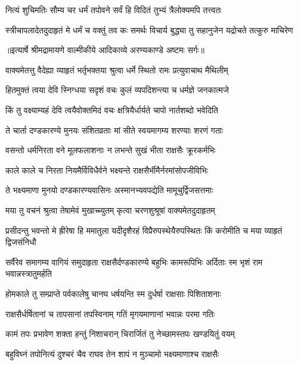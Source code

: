 \twolineshloka
{नित्यं शुचिमतिः सौम्य चर धर्मं तपोवने}
{सर्वं हि विदितं तुभ्यं त्रैलोक्यमपि तत्त्वतः} %

\fourlineindentedshloka
{स्त्रीचापलादेतदुदाहृतं मे}
{धर्मं च वक्तुं तव कः समर्थः}
{विचार्य बुद्ध्या तु सहानुजेन}
{यद्रोचते तत्कुरु माचिरेण} %


{॥इत्यार्षे श्रीमद्रामायणे वाल्मीकीये आदिकाव्ये अरण्यकाण्डे अष्टमः सर्गः॥}


\twolineshloka
{वाक्यमेतत्तु वैदेह्या व्याहृतं भर्तृभक्तया}
{श्रुत्वा धर्मे स्थितो रामः प्रत्युवाचाथ मैथिलीम्} %

\twolineshloka
{हितमुक्तं त्वया देवि स्निग्धया सदृशं वचः}
{कुलं व्यपदिशन्त्या च धर्मज्ञे जनकात्मजे} %

\twolineshloka
{किं तु वक्ष्याम्यहं देवि त्वयैवोक्तमिदं वचः}
{क्षत्रियैर्धार्यते चापो नार्तशब्दो भवेदिति} %

\twolineshloka
{ते चार्ता दण्डकारण्ये मुनयः संशितव्रताः}
{मां सीते स्वयमागम्य शरण्याः शरणं गताः} %

\twolineshloka
{वसन्तो धर्मनिरता वने मूलफलाशनाः}
{न लभन्ते सुखं भीता राक्षसैः क्रूरकर्मभिः} %

\twolineshloka
{काले काले च निरता नियमैर्विविधैर्वने}
{भक्ष्यन्ते राक्षसैर्भीमैर्नरमांसोपजीविभिः} %

\twolineshloka
{ते भक्ष्यमाणा मुनयो दण्डकारण्यवासिनः}
{अस्मानभ्यवपद्येति मामूचुर्द्विजसत्तमाः} %

\twolineshloka
{मया तु वचनं श्रुत्वा तेषामेवं मुखाच्च्युतम्}
{कृत्वा चरणशुश्रूषां वाक्यमेतदुदाहृतम्} %

\threelineshloka
{प्रसीदन्तु भवन्तो मे ह्रीरेषा हि ममातुला}
{यदीदृशैरहं विप्रैरुपस्थेयैरुपस्थितः}
{किं करोमीति च मया व्याहृतं द्विजसंनिधौ} %

\threelineshloka
{सर्वैरेव समागम्य वागियं समुदाहृता}
{राक्षसैर्दण्डकारण्ये बहुभिः कामरूपिभिः}
{अर्दिताः स्म भृशं राम भवान्नस्त्रातुमर्हति} %

\twolineshloka
{होमकाले तु सम्प्राप्ते पर्वकालेषु चानघ}
{धर्षयन्ति स्म दुर्धर्षा राक्षसाः पिशिताशनाः} %

\twolineshloka
{राक्षसैर्धर्षितानां च तापसानां तपस्विनाम्}
{गतिं मृगयमाणानां भवान्नः परमा गतिः} %

\twolineshloka
{कामं तपः प्रभावेण शक्ता हन्तुं निशाचरान्}
{चिरार्जितं तु नेच्छामस्तपः खण्डयितुं वयम्} %

\twolineshloka
{बहुविघ्नं तपोनित्यं दुश्चरं चैव राघव}
{तेन शापं न मुञ्चामो भक्ष्यमाणाश्च राक्षसैः} %

